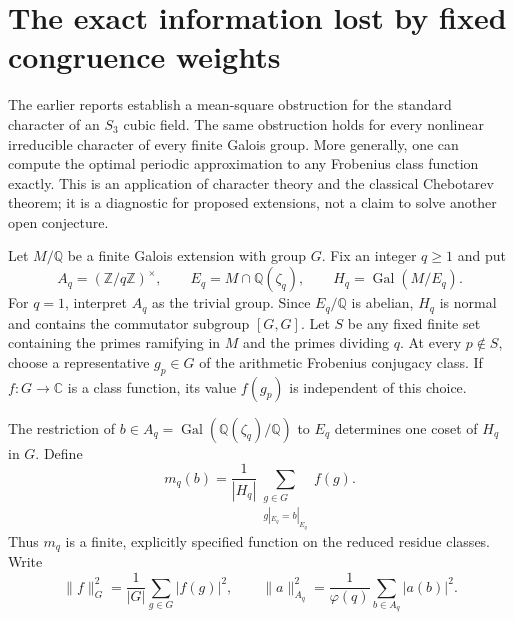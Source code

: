 \section{The exact information lost by fixed congruence weights}
\label{sec:periodic-obstruction}

The earlier reports establish a mean-square obstruction for the standard
character of an $S_3$ cubic field. The same obstruction holds for every
nonlinear irreducible character of every finite Galois group. More generally,
one can compute the optimal periodic approximation to any Frobenius class
function exactly. This is an application of character theory and the classical
Chebotarev theorem; it is a diagnostic for proposed extensions, not a claim
to solve another open conjecture.

Let $M/\mathbb Q$ be a finite Galois extension with group $G$. Fix an integer
$q\ge1$ and put
\[
 A_q=(\mathbb Z/q\mathbb Z)^\times,\qquad
 E_q=M\cap\mathbb Q(\zeta_q),\qquad
 H_q=\operatorname{Gal}(M/E_q).
\]
For $q=1$, interpret $A_q$ as the trivial group. Since $E_q/\mathbb Q$ is
abelian, $H_q$ is normal and contains the commutator subgroup $[G,G]$.
Let $S$ be any fixed finite set containing the primes ramifying in $M$ and
the primes dividing $q$. At every $p\notin S$, choose a representative
$g_p\in G$ of the arithmetic Frobenius conjugacy class. If $f:G\to\mathbb C$ is a class
function, its value $f(g_p)$ is independent of this choice.

The restriction of $b\in A_q=\operatorname{Gal}(\mathbb Q(\zeta_q)/\mathbb Q)$
to $E_q$ determines one coset of $H_q$ in $G$. Define
\begin{equation}\label{eq:periodic-best}
 m_q(b)=\frac1{|H_q|}
   \sum_{\substack{g\in G\\g|_{E_q}=b|_{E_q}}}f(g).
\end{equation}
Thus $m_q$ is a finite, explicitly specified function on the reduced residue
classes. Write
\[
 \|f\|_G^2=\frac1{|G|}\sum_{g\in G}|f(g)|^2,
 \qquad
 \|a\|_{A_q}^2=\frac1{\varphi(q)}\sum_{b\in A_q}|a(b)|^2.
\]

